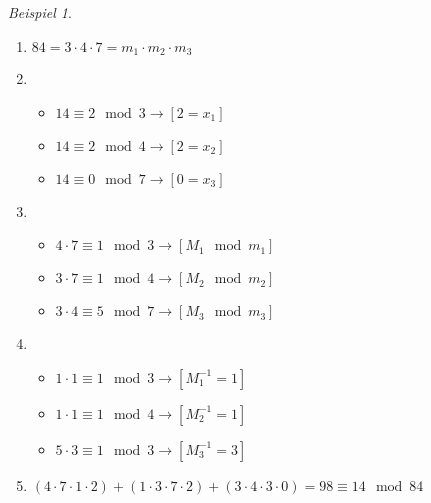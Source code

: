 \documentclass{scrreprt}
\theoremstyle{remark}
\newtheorem{beispiel}[definition]{Beispiel}
\begin{document}
\begin{beispiel}
  \begin{enumerate}
    \hfill
  \item $84 = 3\cdot4\cdot7 = m_{1}\cdot m_{2} \cdot m_{3}$
  \item
    \begin{itemize}
    \item $14 \equiv 2 \mod 3\rightarrow [2 = x_{1}]$
    \item $14 \equiv 2 \mod 4\rightarrow [2 = x_{2}]$
    \item $14 \equiv 0 \mod 7\rightarrow [0 = x_{3}]$
    \end{itemize}
  \item
    \begin{itemize}
    \item $4\cdot 7\equiv 1 \mod{3} \rightarrow [M_{1}\mod{m_{1}}]$
    \item $3\cdot 7\equiv 1 \mod{4} \rightarrow [M_{2}\mod{m_{2}}]$
    \item $3\cdot 4\equiv 5 \mod{7} \rightarrow [M_{3}\mod{m_{3}}]$
    \end{itemize}
  \item
    \begin{itemize}
      \item $1\cdot1\equiv 1 \mod{3} \rightarrow [M_{1}^{-1} = 1]$ 
      \item $1\cdot1\equiv 1 \mod{4} \rightarrow [M_{2}^{-1} = 1]$
      \item $5\cdot3\equiv 1 \mod{3} \rightarrow [M_{3}^{-1} = 3]$ 
    \end{itemize}
    \item $(4\cdot7\cdot1\cdot2)+(1\cdot3\cdot7\cdot2)+(3\cdot4\cdot3\cdot0) = \boxed{98\equiv14 \mod{84}}$
  \end{enumerate}
\end{beispiel}
\end{document}
